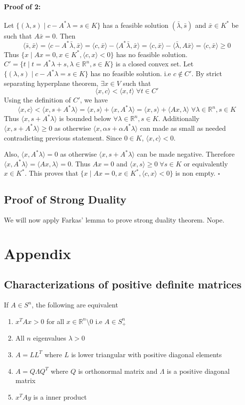 \documentclass[a4paper,11pt]{article}
\newcommand{\Rn}{\mathbb{R}^n}
\newcommand\inrpd[2]{\langle #1, #2 \rangle}
\begin{document}
\paragraph{Proof of 2:}
Let  $\{(\lambda,s) \mid c - A^*\lambda  = s \in K \}$  has a  feasible solution $(\bar{\lambda},\bar{s})$ and  $\bar{x} \in K^*$ be such that $A\bar{x} = 0$. Then 
\[
\inrpd{\bar{s}}{\bar{x}} =  \inrpd{c - A^*\bar{\lambda} }{\bar{x}} = \inrpd{c}{\bar{x}} - \inrpd{ A^*\bar{\lambda} }{\bar{x}}
= \inrpd{c}{\bar{x}} - \inrpd{ \bar{\lambda} }{A\bar{x}} = \inrpd{c}{\bar{x}} \geq 0
\]
Thus $\{x \mid Ax = 0, x\in K^*, \inrpd{c}{x} < 0 \}$ has no feasible solution.
\\


$C' = \{t \mid t = A^*\lambda  + s, \lambda \in \Rn, s \in K \}$ is a closed convex set. Let $\{(\lambda,s) \mid c - A^*\lambda  = s \in K \}$  has no feasible solution. i.e $c \notin C'$.
By strict separating hyperplane theorem, $\exists x \in V$ such that 
\[ \inrpd{x}{c} < \inrpd{x}{t}\; \forall t \in C'\]
Using the definition of $C'$, we have 
\[ \inrpd{x}{c} < \inrpd{x}{s + A^*\lambda} = \inrpd{x}{s}  + \inrpd{x}{A^*\lambda}
 =  \inrpd{x}{s}  + \inrpd{Ax}{\lambda}
\; \forall \lambda \in \Rn,  s \in K
\]
Thus $\inrpd{x}{s + A^*\lambda}$ is bounded below $\forall \lambda \in \Rn, s \in K$. Additionally $\inrpd{x}{s + A^*\lambda} \geq 0$ as otherwise $\inrpd{x}{\alpha s + \alpha A^*\lambda}$ can made as small as needed contradicting previous statement. Since $0 \in K$, $\inrpd{x}{c} <0$. 


Also, $\inrpd{x}{A^*\lambda} = 0$ as otherwise $\inrpd{x}{ s + A^*\lambda}$ can be made negative.
Therefore $\inrpd{x}{A^*\lambda} = \inrpd{Ax}{\lambda} = 0$. Thus $Ax = 0$ and $\inrpd{x}{s} \geq 0 \; \forall s \in K$ or equivalently $x \in K^*$.
This proves that $\{x \mid Ax = 0, x\in K^*, \inrpd{c}{x} < 0 \}$ is non empty.
$\square$


\subsection{Proof of Strong Duality}
We will now apply Farkas' lemma to prove strong duality theorem.
Nope.

\appendix
\section{Appendix}
\subsection{Characterizations of positive definite matrices}
If $A \in S^n$, the following are equivalent
\begin{enumerate}
\item $x^T A x > 0$ for all $x \in \Rn \setminus{0}$ i.e $A\in S^n_+$
\item All $n$ eigenvalues $\lambda > 0$
\item $A = LL^T$ where $L$ is lower triangular with positive diagonal elements
\item $A = Q\Lambda Q^T$ where $Q$ is orthonormal matrix and $\Lambda$ is a positive diagonal matrix
\item $x^T A y$ is a inner product
\end{enumerate}
\end{document}
